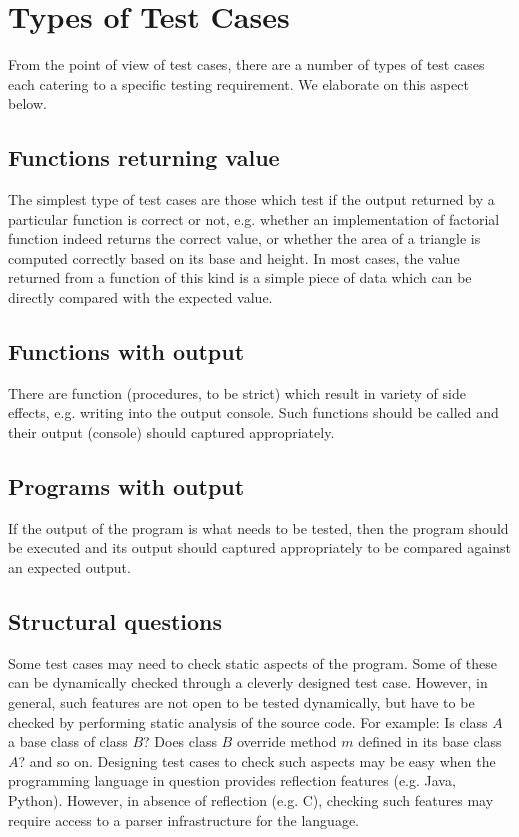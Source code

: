 \documentclass{article}
\begin{document}
\section{Types of Test Cases}
From the point of view of test cases, there are a number of types of test cases each catering to a specific testing requirement. We elaborate on this aspect below.
\subsection{Functions returning value}
The simplest type of test cases are those which test if the output returned by a particular function is correct or not, e.g. whether an implementation of factorial function indeed returns the correct value, or whether the area of a triangle is computed correctly based on its base and height. In most cases, the value returned from a function of this kind is a simple piece of data which can be directly compared with the expected value.
\subsection{Functions with output}
There are function (procedures, to be strict) which result in variety of side effects, e.g. writing into the output console. Such functions should be called and their output (console) should captured appropriately.

\subsection{Programs with output}
If the output of the program is what needs to be tested, then the program should be executed and its output should captured appropriately to be compared against an expected output.

\subsection{Structural questions}
Some test cases may need to check static aspects of the program. Some of these can be dynamically checked through a cleverly designed test case. However, in general, such features are not open to be tested dynamically, but have to be checked by performing static analysis of the source code. For example: Is class $A$ a base class of class $B$? Does class $B$ override method $m$ defined in its base class $A$? and so on. Designing test cases to check such aspects may be easy when the programming language in question provides reflection features (e.g. Java, Python). However, in absence of reflection (e.g. C), checking such features may require access to a parser infrastructure for the language.
\end{document}

